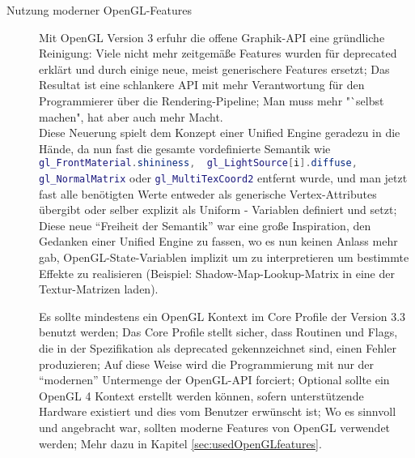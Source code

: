 \begin{description}
	\item[Nutzung moderner OpenGL-Features]
	Mit OpenGL Version 3 erfuhr die offene Graphik-API eine gründliche Reinigung: Viele nicht mehr zeitgemäße Features 
	wurden für deprecated erklärt und durch einige neue, meist generischere Features ersetzt;
	Das Resultat ist eine schlankere API mit mehr Verantwortung für den Programmierer über die Rendering-Pipeline;
	Man muss mehr "`selbst machen", hat aber auch mehr Macht.\\
	Diese Neuerung spielt dem Konzept einer Unified Engine geradezu in die Hände, da nun fast die gesamte vordefinierte 
	Semantik wie 
	\lstinline[language=GLSL]|gl_FrontMaterial.shininess,  gl_LightSource[i].diffuse, gl_NormalMatrix| oder 
	\lstinline[language=GLSL]|gl_MultiTexCoord2|
 	entfernt wurde, und man jetzt fast alle benötigten Werte entweder als generische Vertex-Attributes übergibt oder 
 	selber explizit als Uniform - Variablen definiert und setzt; Diese neue "`Freiheit der Semantik"' war eine große 
 	Inspiration, den Gedanken einer Unified Engine zu fassen, wo es nun keinen Anlass mehr gab, OpenGL-State-Variablen 
 	implizit um zu interpretieren um bestimmte Effekte zu realisieren (Beispiel: Shadow-Map-Lookup-Matrix in eine der 	
 	Textur-Matrizen laden).
	
	Es sollte mindestens ein OpenGL Kontext im Core Profile der Version 3.3 benutzt werden; Das Core Profile stellt sicher,
	dass Routinen und Flags, die in der Spezifikation als deprecated gekennzeichnet sind, einen Fehler produzieren;
	Auf diese Weise wird die Programmierung mit nur der "`modernen"' Untermenge der OpenGL-API forciert;
	Optional sollte ein OpenGL 4 Kontext erstellt werden können, sofern unterstützende Hardware existiert und dies vom 
	Benutzer erwünscht ist;
	Wo es sinnvoll und angebracht war, sollten moderne Features von OpenGL verwendet werden;
	Mehr dazu in Kapitel \ref{sec:usedOpenGLfeatures}.


\end{description}
